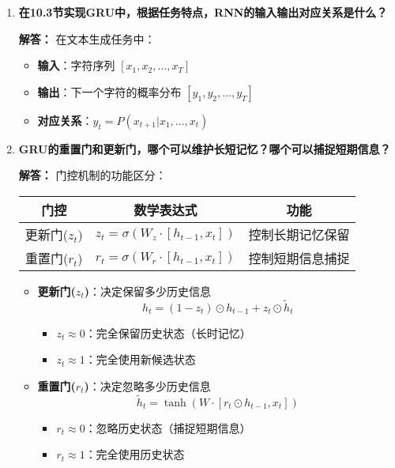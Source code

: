 \documentclass[a4paper,12pt]{book}
\begin{document}
\begin{enumerate}[label=\arabic*.]
    \item \textbf{在10.3节实现GRU中，根据任务特点，RNN的输入输出对应关系是什么？}
    
    \textbf{解答：} 在文本生成任务中：
    \begin{itemize}
        \item \textbf{输入}：字符序列 $[x_1, x_2, \ldots, x_T]$
        \item \textbf{输出}：下一个字符的概率分布 $[y_1, y_2, \ldots, y_T]$
        \item \textbf{对应关系}：$y_t = P(x_{t+1} | x_1, \ldots, x_t)$
    \end{itemize}
    
    
    \item \textbf{GRU的重置门和更新门，哪个可以维护长短记忆？哪个可以捕捉短期信息？}
    
    \textbf{解答：} 门控机制的功能区分：
    \begin{table}[h]
        \centering
        \begin{tabular}{c|c|c}
            \toprule
            \textbf{门控} & \textbf{数学表达式} & \textbf{功能} \\
            \midrule
            更新门($z_t$) & $z_t = \sigma(W_z \cdot [h_{t-1}, x_t])$ & 控制长期记忆保留 \\
            重置门($r_t$) & $r_t = \sigma(W_r \cdot [h_{t-1}, x_t])$ & 控制短期信息捕捉 \\
            \bottomrule
        \end{tabular}
    \end{table}
    
    \begin{itemize}
        \item \textbf{更新门($z_t$)}：决定保留多少历史信息
        \[
        h_t = (1 - z_t) \odot h_{t-1} + z_t \odot \tilde{h}_t
        \]
        \begin{itemize}
            \item $z_t \approx 0$：完全保留历史状态（长时记忆）
            \item $z_t \approx 1$：完全使用新候选状态
        \end{itemize}
        
        \item \textbf{重置门($r_t$)}：决定忽略多少历史信息
        \[
        \tilde{h}_t = \tanh(W \cdot [r_t \odot h_{t-1}, x_t])
        \]
        \begin{itemize}
            \item $r_t \approx 0$：忽略历史状态（捕捉短期信息）
            \item $r_t \approx 1$：完全使用历史状态
        \end{itemize}
    \end{itemize}
    

\end{enumerate}
\end{document}
